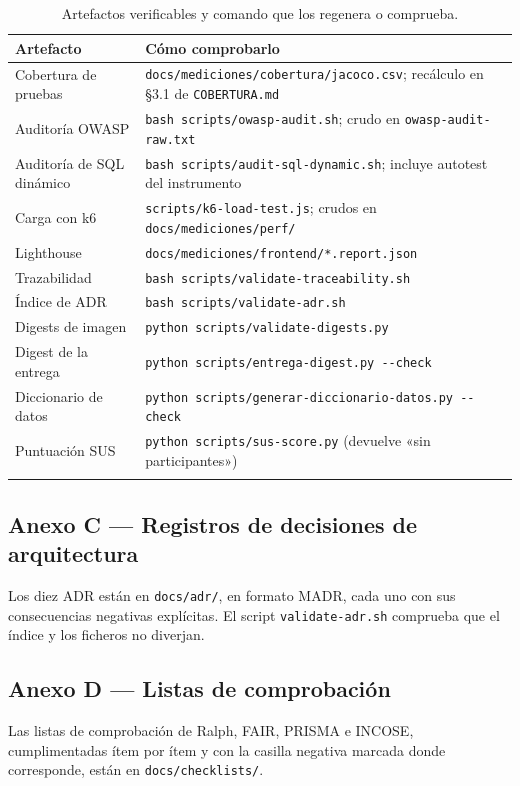 \documentclass[11pt,a4paper]{article}
\begin{document}
\begin{longtable}{@{}p{5.6cm}p{9.4cm}@{}}
\toprule
\textbf{Artefacto} & \textbf{Cómo comprobarlo} \\
\midrule
\endhead
Cobertura de pruebas & \texttt{docs\-/mediciones\-/cobertura\-/jacoco.csv}; recálculo en §3.1 de \texttt{COBERTURA.md} \\
Auditoría OWASP & \texttt{bash scripts\-/owasp-audit.sh}; crudo en \texttt{owasp-audit-raw.txt} \\
Auditoría de SQL dinámico & \texttt{bash scripts\-/audit-sql-dynamic.sh}; incluye autotest del instrumento \\
Carga con k6 & \texttt{scripts\-/k6-load-test.js}; crudos en \texttt{docs\-/mediciones\-/perf\-/} \\
Lighthouse & \texttt{docs\-/mediciones\-/frontend\-/*.report.json} \\
Trazabilidad & \texttt{bash scripts\-/validate-traceability.sh} \\
Índice de ADR & \texttt{bash scripts\-/validate-adr.sh} \\
Digests de imagen & \texttt{python scripts\-/validate-digests.py} \\
Digest de la entrega & \texttt{python scripts\-/entrega-digest.py -{}-check} \\
Diccionario de datos & \texttt{python scripts\-/generar-diccionario-datos.py -{}-check} \\
Puntuación SUS & \texttt{python scripts\-/sus-score.py} (devuelve «sin participantes») \\
\bottomrule
\caption{Artefactos verificables y comando que los regenera o comprueba.}
\label{tab:artefactos}
\end{longtable}

\subsection{Anexo C --- Registros de decisiones de arquitectura}

Los diez ADR están en \texttt{docs\-/adr\-/}, en formato MADR, cada uno con sus
consecuencias negativas explícitas. El script \texttt{validate-adr.sh} comprueba
que el índice y los ficheros no diverjan.

\subsection{Anexo D --- Listas de comprobación}

Las listas de comprobación de Ralph, FAIR, PRISMA e INCOSE, cumplimentadas ítem
por ítem y con la casilla negativa marcada donde corresponde, están en
\texttt{docs\-/checklists\-/}.



\end{document}
